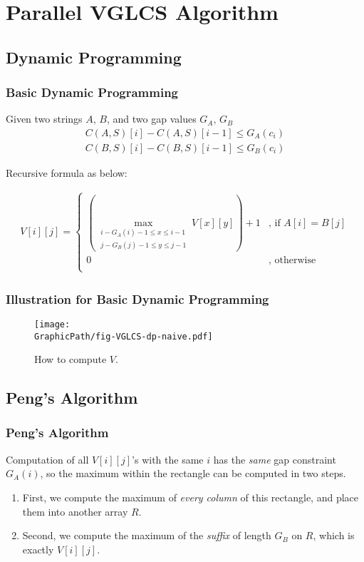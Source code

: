 \section{Parallel VGLCS Algorithm}

\subsection{Dynamic Programming}
\begin{frame}
    \frametitle{Basic Dynamic Programming}
	Given two strings $A$, $B$, and two gap values $G_{A}$, $G_{B}$
	\begin{align*}
        C(A, S)[i] - C(A, S)[i-1] \le G_{A}(c_i) \\
        C(B, S)[i] - C(B, S)[i-1] \le G_{B}(c_i)
    \end{align*}	

    Recursive formula as below:

    \begin{align*}
    	V[i][j] = \left\{\begin{matrix}
 			(\max\limits_{
 				\substack{i-G_A(i)-1 \le x \le i-1 \\ 
 						  j-G_B(j)-1 \le y \le j-1}} 
 				V[x][y])+1
 				& \text{, if } A[i] = B[j] \\
 				0 & \text{, otherwise}\\
			\end{matrix}\right.
    \end{align*}
\end{frame}

\begin{frame}
    \frametitle{Illustration for Basic Dynamic Programming}
	\begin{figure}[!thb]
		\texttt{[image: \\GraphicPath/fig-VGLCS-dp-naive.pdf]}
		\caption{How to compute $V$.}
		\label{fig:basic-dp-VGLCS}
	\end{figure}
\end{frame}

\subsection{Peng's Algorithm}
\begin{frame}
    \frametitle{Peng's Algorithm}
   	Computation of all $V[i][j]$'s with the same $i$ has the {\em same}
	gap constraint $G_A(i)$, so the maximum within the rectangle can be
	computed in two steps.

    \begin{enumerate}
    	\setlength\itemsep{1em}
    	\item 
    		First, we compute the maximum of {\em every column} of this
			rectangle, and place them into another array $R$.
		\item 
			Second, we compute the maximum of the {\em suffix} of length
			$G_B$ on $R$, which is exactly $V[i][j]$.
    \end{enumerate}
\end{frame}

